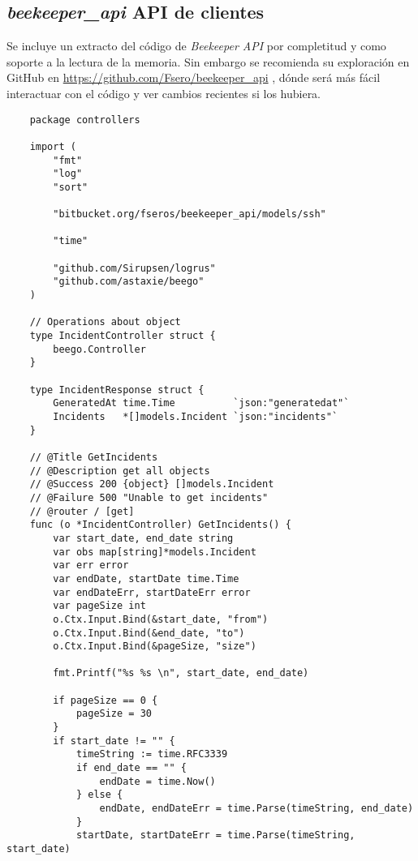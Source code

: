 \subsection{\emph{beekeeper\_api} API de clientes}
\label{subsec:anexos-beekeeper-api-src-code}

Se incluye un extracto del código de \emph{Beekeeper API} por completitud y como soporte a la lectura de la memoria. Sin
embargo se recomienda su exploración en GitHub en \href{https://github.com/Fsero/beekeeper\_api}{https://github.com/Fsero/beekeeper\_api} , dónde será más fácil interactuar con el código y ver cambios recientes si los 
hubiera.


\begin{verbatim}
    package controllers
    
    import (
        "fmt"
        "log"
        "sort"
    
        "bitbucket.org/fseros/beekeeper_api/models/ssh"
    
        "time"
    
        "github.com/Sirupsen/logrus"
        "github.com/astaxie/beego"
    )
    
    // Operations about object
    type IncidentController struct {
        beego.Controller
    }
    
    type IncidentResponse struct {
        GeneratedAt time.Time          `json:"generatedat"`
        Incidents   *[]models.Incident `json:"incidents"`
    }
    
    // @Title GetIncidents
    // @Description get all objects
    // @Success 200 {object} []models.Incident
    // @Failure 500 "Unable to get incidents"
    // @router / [get]
    func (o *IncidentController) GetIncidents() {
        var start_date, end_date string
        var obs map[string]*models.Incident
        var err error
        var endDate, startDate time.Time
        var endDateErr, startDateErr error
        var pageSize int
        o.Ctx.Input.Bind(&start_date, "from")
        o.Ctx.Input.Bind(&end_date, "to")
        o.Ctx.Input.Bind(&pageSize, "size")
    
        fmt.Printf("%s %s \n", start_date, end_date)
    
        if pageSize == 0 {
            pageSize = 30
        }
        if start_date != "" {
            timeString := time.RFC3339
            if end_date == "" {
                endDate = time.Now()
            } else {
                endDate, endDateErr = time.Parse(timeString, end_date)
            }
            startDate, startDateErr = time.Parse(timeString, start_date)
    

\end{verbatim}
